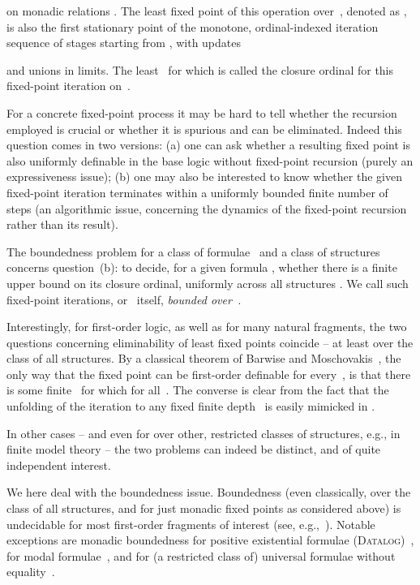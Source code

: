 \documentclass{LMCS}
\begin{document}
on monadic relations .
The least fixed point of this operation over~,
denoted as , is also the first stationary point
of the monotone, ordinal-indexed iteration sequence of stages  starting from
, with updates

and unions in limits. 
The least~ for which
 is called the closure
ordinal for this fixed-point iteration on~.

For a concrete fixed-point process it may be hard to tell
whether the recursion employed is crucial or whether it is
spurious and can be eliminated.
Indeed this question comes in two versions\?:
(a) one can ask whether a resulting fixed point is also
uniformly definable in the base logic without fixed-point recursion
(purely an expressiveness issue)\?;
(b) one may also be interested to know whether the given fixed-point
iteration terminates within a uniformly bounded finite number
of steps (an algorithmic issue, concerning the dynamics of the
fixed-point recursion rather than its result).

The boundedness problem 
for a class of formulae~
and a class of structures~
concerns question~(b)\?: to decide, for a given formula ,
whether there is a finite upper bound on its closure
ordinal, uniformly across all structures .
We call such fixed-point iterations, or~ itself,
\emph{bounded over~.}

Interestingly, for first-order logic, as well as for many natural
fragments, the two questions concerning eliminability of least fixed
points coincide -- at least over the class of all structures.
By a classical theorem of
Barwise and Moschovakis~\cite{BarwiseMoschovakis78},
the only way that the fixed point  can be
first-order definable for every~, is that there is some finite~
for which 
for all~. The converse is clear from the fact that the unfolding
of the iteration to any fixed finite depth~ is easily mimicked
in .

In other cases -- and even for  over other, restricted classes of
structures, e.g., in finite model theory -- the two problems can
indeed be distinct, and of quite independent interest.

We here deal with the boundedness issue.
Boundedness (even classically, over the class of all structures, and
for just monadic fixed points as considered above) is
undecidable for most first-order fragments of interest (see, e.g.,~\cite{HillebrandEtAl95}).
Notable exceptions are monadic boundedness for positive existential
formulae (\textsc{Datalog})~\cite{CosmadakisGaKaVa88},
for modal formulae~\cite{Otto99}, and for
(a restricted class of) universal formulae without equality~\cite{Otto06}.
\end{document}
